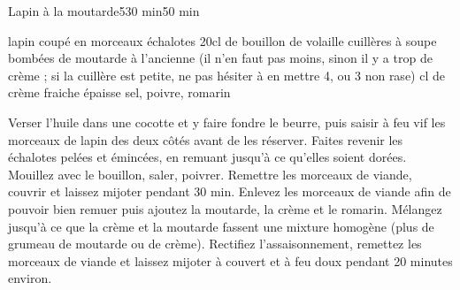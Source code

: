 \begin{recette}{Lapin à la moutarde}{5}{30 min}{50 min}
\begin{ingredients}[6 pers.]
 lapin coupé en morceaux
 échalotes
\ingredient 20cl de bouillon de volaille
 cuillères à soupe bombées de moutarde à l'ancienne (il n'en faut pas moins, sinon il y a trop de crème ; si la 
cuillère est petite, ne pas hésiter à en mettre 4, ou 3 non rase)
 cl de crème fraiche épaisse
\ingredient sel, poivre, romarin
\end{ingredients}

\begin{preparation}
\etape Verser l'huile dans une cocotte et y faire fondre le beurre, puis saisir à feu vif les morceaux de lapin des deux côtés avant de les réserver.
\etape Faites revenir les échalotes pelées et émincées, en remuant jusqu'à ce qu'elles soient dorées.
\etape Mouillez avec le bouillon, saler, poivrer. Remettre les morceaux de viande, couvrir et laissez mijoter pendant 30 min.
\etape Enlevez les morceaux de viande afin de pouvoir bien remuer puis ajoutez la moutarde, la crème et le romarin. Mélangez jusqu'à ce que la crème et la moutarde fassent une mixture homogène (plus de grumeau de moutarde ou de crème). 
\etape Rectifiez l'assaisonnement, remettez les morceaux de viande et laissez mijoter à couvert et à feu doux pendant 20 minutes environ.
\end{preparation}
\end{recette}

